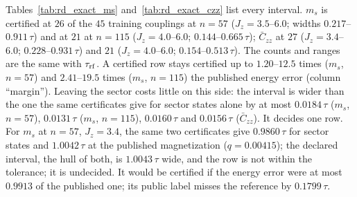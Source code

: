 \documentclass[aps,prx,onecolumn,10pt,nofootinbib,longbibliography,floatfix]{revtex4-2}
\theoremstyle{remark}
\newcommand{\Jz}{J_z}
\newcommand{\ms}{m_s}
\newcommand{\Czz}{\bar C_{zz}}
\begin{document}
Tables~\ref{tab:rd_exact_ms} and~\ref{tab:rd_exact_czz} list every interval. $\ms$ is certified at $26$ of the $45$ %
training couplings at $n=57$ ($\Jz=3.5$--$6.0$; widths $0.217$--$0.911\,\tau$) and at $21$ at $n=115$ ($\Jz=4.0$--$6.0$; %
$0.144$--$0.665\,\tau$); $\Czz$ at $27$ ($\Jz=3.4$--$6.0$; $0.228$--$0.931\,\tau$) and $21$ ($\Jz=4.0$--$6.0$; %
$0.154$--$0.513\,\tau$). The counts and ranges are the same with $\tau_{\rm rf}$. A certified row stays certified up %
to $1.20$--$12.5$ times ($\ms$, $n=57$) and $2.41$--$19.5$ times ($\ms$, $n=115$) the published energy error (column %
``margin''). Leaving the sector costs little on this side: the interval is wider than the one the same certificates %
give for sector states alone by at most $0.0184\,\tau$ ($\ms$, $n=57$), $0.0131\,\tau$ ($\ms$, $n=115$), $0.0160\,\tau$ %
and $0.0156\,\tau$ ($\Czz$). It decides one row. For $\ms$ at $n=57$, $\Jz=3.4$, the same two certificates give %
$0.9860\,\tau$ for sector states and $1.0042\,\tau$ at the published magnetization ($q=0.00415$); the declared %
interval, the hull of both, is $1.0043\,\tau$ wide, and the row is not within the tolerance; it is undecided. It %
would be certified if the energy error were at most $0.9913$ of the published one; its public label misses the %
reference by $0.1799\,\tau$. %
\end{document}
